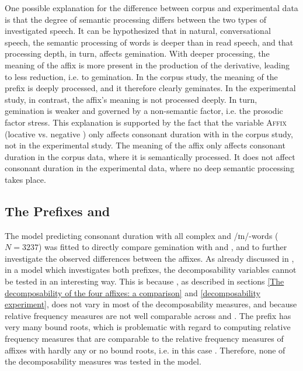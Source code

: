 One possible explanation for the difference between corpus and experimental data is that the degree of semantic processing differs between the two types of investigated speech. It can be hypothesized that in natural, conversational speech,  the semantic processing of words is deeper than in read speech, and that processing depth, in turn, affects gemination. With deeper processing, the meaning of the affix is more present in the production of the derivative, leading to less reduction, i.e. to gemination. 
 In the corpus study, the meaning of the prefix is deeply processed, and it therefore clearly geminates. In the experimental study, in contrast, the affix's meaning is not processed deeply. In turn, gemination is weaker and governed by a non-semantic factor,  i.e. the prosodic factor stress.
  This explanation is supported by the fact that the variable \textsc{Affix} (locative  vs. negative ) only affects consonant duration with  in the corpus study, not in the experimental study. The meaning of the affix only affects consonant duration in the corpus data, where it is semantically processed. It does not affect consonant duration in the experimental data, where no deep semantic processing takes place.





\subsection{The Prefixes  and }

The model predicting consonant duration with all complex  and /ɪn/-words ($N=3237$) was fitted to directly compare gemination with  and , and to further investigate the observed differences between the affixes.
As already discussed in , in a model which investigates both prefixes, the decomposability variables cannot be tested in an interesting way. This is because , as described in sections \ref{The decomposability of the four affixes: a comparison} and \ref{decomposability experiment}, does not vary in most of the decomposability measures, and because relative frequency measures are not well comparable across  and . The prefix  has very many bound roots, which is problematic with regard to computing relative frequency measures that are comparable to the relative frequency measures of affixes with hardly any or no bound roots, i.e. in this case . Therefore, none of the decomposability measures was tested in the model. 

